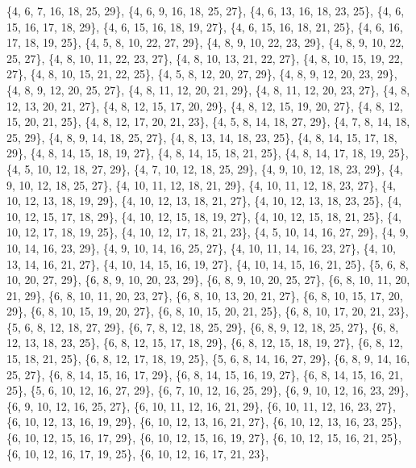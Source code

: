 \documentclass[11pt,a4paper]{article}
\begin{document}
{\{4, 6, 7, 16, 18, 25, 29\}, \{4, 6, 9, 16, 18, 25, 27\}, \{4, 6, 13, 16, 18, 23, 25\}, \{4, 6, 15, 16, 17, 18, 29\}, \{4, 6, 15, 16, 18, 19, 27\},
\{4, 6, 15, 16, 18, 21, 25\}, \{4, 6, 16, 17, 18, 19, 25\}, \{4, 5, 8, 10, 22, 27, 29\}, \{4, 8, 9, 10, 22, 23, 29\}, \{4, 8, 9, 10, 22, 25, 27\},
\{4, 8, 10, 11, 22, 23, 27\}, \{4, 8, 10, 13, 21, 22, 27\}, \{4, 8, 10, 15, 19, 22, 27\}, \{4, 8, 10, 15, 21, 22, 25\}, \{4, 5, 8, 12, 20, 27, 29\},
\{4, 8, 9, 12, 20, 23, 29\}, \{4, 8, 9, 12, 20, 25, 27\}, \{4, 8, 11, 12, 20, 21, 29\}, \{4, 8, 11, 12, 20, 23, 27\}, \{4, 8, 12, 13, 20, 21, 27\},
\{4, 8, 12, 15, 17, 20, 29\}, \{4, 8, 12, 15, 19, 20, 27\}, \{4, 8, 12, 15, 20, 21, 25\}, \{4, 8, 12, 17, 20, 21, 23\}, \{4, 5, 8, 14, 18, 27, 29\},
\{4, 7, 8, 14, 18, 25, 29\}, \{4, 8, 9, 14, 18, 25, 27\}, \{4, 8, 13, 14, 18, 23, 25\}, \{4, 8, 14, 15, 17, 18, 29\}, \{4, 8, 14, 15, 18, 19, 27\},
\{4, 8, 14, 15, 18, 21, 25\}, \{4, 8, 14, 17, 18, 19, 25\}, \{4, 5, 10, 12, 18, 27, 29\}, \{4, 7, 10, 12, 18, 25, 29\}, \{4, 9, 10, 12, 18, 23, 29\},
\{4, 9, 10, 12, 18, 25, 27\}, \{4, 10, 11, 12, 18, 21, 29\}, \{4, 10, 11, 12, 18, 23, 27\}, \{4, 10, 12, 13, 18, 19, 29\}, \{4, 10, 12, 13, 18, 21, 27\},
\{4, 10, 12, 13, 18, 23, 25\}, \{4, 10, 12, 15, 17, 18, 29\}, \{4, 10, 12, 15, 18, 19, 27\}, \{4, 10, 12, 15, 18, 21, 25\}, \{4, 10, 12, 17, 18, 19, 25\},
\{4, 10, 12, 17, 18, 21, 23\}, \{4, 5, 10, 14, 16, 27, 29\}, \{4, 9, 10, 14, 16, 23, 29\}, \{4, 9, 10, 14, 16, 25, 27\}, \{4, 10, 11, 14, 16, 23, 27\},
\{4, 10, 13, 14, 16, 21, 27\}, \{4, 10, 14, 15, 16, 19, 27\}, \{4, 10, 14, 15, 16, 21, 25\}, \{5, 6, 8, 10, 20, 27, 29\}, \{6, 8, 9, 10, 20, 23, 29\},
\{6, 8, 9, 10, 20, 25, 27\}, \{6, 8, 10, 11, 20, 21, 29\}, \{6, 8, 10, 11, 20, 23, 27\}, \{6, 8, 10, 13, 20, 21, 27\}, \{6, 8, 10, 15, 17, 20, 29\},
\{6, 8, 10, 15, 19, 20, 27\}, \{6, 8, 10, 15, 20, 21, 25\}, \{6, 8, 10, 17, 20, 21, 23\}, \{5, 6, 8, 12, 18, 27, 29\}, \{6, 7, 8, 12, 18, 25, 29\},
\{6, 8, 9, 12, 18, 25, 27\}, \{6, 8, 12, 13, 18, 23, 25\}, \{6, 8, 12, 15, 17, 18, 29\}, \{6, 8, 12, 15, 18, 19, 27\}, \{6, 8, 12, 15, 18, 21, 25\},
\{6, 8, 12, 17, 18, 19, 25\}, \{5, 6, 8, 14, 16, 27, 29\}, \{6, 8, 9, 14, 16, 25, 27\}, \{6, 8, 14, 15, 16, 17, 29\}, \{6, 8, 14, 15, 16, 19, 27\},
\{6, 8, 14, 15, 16, 21, 25\}, \{5, 6, 10, 12, 16, 27, 29\}, \{6, 7, 10, 12, 16, 25, 29\}, \{6, 9, 10, 12, 16, 23, 29\}, \{6, 9, 10, 12, 16, 25, 27\},
\{6, 10, 11, 12, 16, 21, 29\}, \{6, 10, 11, 12, 16, 23, 27\}, \{6, 10, 12, 13, 16, 19, 29\}, \{6, 10, 12, 13, 16, 21, 27\}, \{6, 10, 12, 13, 16, 23, 25\},
\{6, 10, 12, 15, 16, 17, 29\}, \{6, 10, 12, 15, 16, 19, 27\}, \{6, 10, 12, 15, 16, 21, 25\}, \{6, 10, 12, 16, 17, 19, 25\}, \{6, 10, 12, 16, 17, 21, 23\},
}
\end{document}
